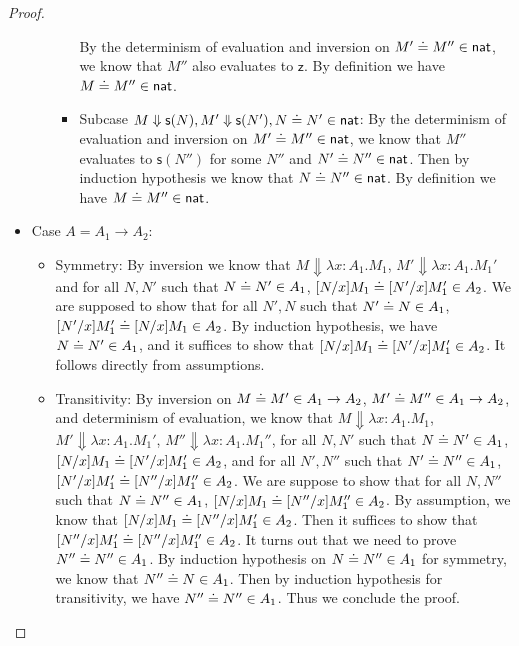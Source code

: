 \documentclass{article}
\newcommand{\eabs}[3]{\lambda #1:#2.#3}
\newcommand{\tnat}{\mathsf{nat}}
\newcommand{\ez}{\mathsf{z}}
\newcommand{\es}[1]{\mathsf{s}(#1)}
\newcommand{\evalto}{\Downarrow}
\begin{document}
\begin{proof}
\begin{itemize}
\begin{itemize}
\begin{itemize}
            By the determinism of evaluation and inversion on $M' \eeq M'' \in \tnat$, we know that $M''$ also evaluates to $\ez$.
            By definition we have $M \eeq M'' \in \tnat$.
            \item Subcase $M \evalto \es{N}, M'\evalto \es{N'}, N \eeq N' \in \tnat$:
            By the determinism of evaluation and inversion on $M' \eeq M'' \in \tnat$, we know that $M''$ evaluates to $\es{N''}$ for some $N''$ and $N' \eeq N'' \in \tnat$.
            Then by induction hypothesis we know that $N \eeq N'' \in \tnat$.
            By definition we have $M \eeq M'' \in \tnat$.
        \end{itemize}
    \end{itemize}
    \item Case $A = A_1 \to A_2$:
    \begin{itemize}
        \item Symmetry:
        By inversion we know that $M \evalto \eabs{x}{A_1}{M_1}$, $M' \evalto \eabs{x}{A_1}{M_1'}$ and for all $N,N'$ such that $N \doteq N' \in A_1$, $[N/x]M_1 \doteq [N'/x]M_1' \in A_2$.
        We are supposed to show that for all $N',N$ such that $N' \doteq N \in A_1$, $[N'/x]M_1' \doteq [N/x]M_1 \in A_2$.
        By induction hypothesis, we have $N \doteq N' \in A_1$, and it suffices to show that $[N/x]M_1 \doteq [N'/x]M_1' \in A_2$.
        It follows directly from assumptions.
        \item Transitivity:
        By inversion on $M \doteq M' \in A_1 \to A_2$, $M' \doteq M'' \in A_1 \to A_2$, and determinism of evaluation, we know that $M \evalto \eabs{x}{A_1}{M_1}$, $M' \evalto \eabs{x}{A_1}{M_1'}$, $M'' \evalto \eabs{x}{A_1}{M_1''}$, for all $N,N'$ such that $N \doteq N' \in A_1$, $[N/x]M_1 \doteq [N'/x]M_1' \in A_2$,
        and for all $N',N''$ such that $N' \doteq N'' \in A_1$, $[N'/x]M_1' \doteq [N''/x]M_1'' \in A_2$.
        We are suppose to show that for all $N,N''$ such that $N \doteq N'' \in A_1$, $[N/x]M_1 \doteq [N''/x]M_1'' \in A_2$.
        By assumption, we know that $[N/x]M_1 \doteq [N''/x]M_1' \in A_2$.
        Then it suffices to show that $[N''/x]M_1' \doteq [N''/x]M_1'' \in A_2$.
        It turns out that we need to prove $N'' \doteq N'' \in A_1$.
        By induction hypothesis on $N \doteq N'' \in A_1$ for symmetry, we know that $N'' \doteq N \in A_1$.
        Then by induction hypothesis for transitivity, we have $N'' \doteq N'' \in A_1$.
        Thus we conclude the proof.
    \end{itemize}
\end{itemize}
\end{proof}
\end{document}
